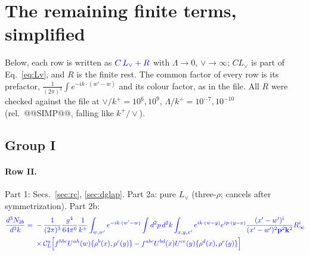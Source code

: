 \documentclass[10pt]{article}
\numberwithin{equation}{section}
\newcommand{\new}[1]{{\color{blue}#1}}
\newcommand{\Lv}{L_{\vee}}
\newcommand{\CL}{\mathcal C_L}
\newcommand{\pre}{\frac{1}{(2\pi)^3}}
\newcommand{\phw}{e^{-ik\cdot(w'-w)}}
\begin{document}
\section{The remaining finite terms, simplified}\label{sec:simp}
Below, each row is written as $\new{C\,\Lv+R}$ with $\Lambda\to0$, $\vee\to\infty$; $C\Lv$ is part of Eq.~\eqref{eq:Lv}, and $R$ is the finite rest. The common factor of every row is its prefactor, $\pre\int\phw$ and its colour factor, as in the file. All $R$ were checked against the file at $\vee/k^+=10^6,10^9$, $\Lambda/k^+=10^{-7},10^{-10}$ (rel.\ @@SIMP@@, falling like $k^+/\vee$).

\subsection{Group I}
\paragraph{Row II.} Part 1: Secs.~\ref{sec:rc}, \ref{sec:dglap}. Part 2a: pure $\Lv$ (three-$\rho$; cancels after symmetrization). Part 2b:
\begin{equation*}
\new{\begin{aligned}\frac{d^3N_{2b}}{d^3k}={}&-\pre\frac{g^4}{64\pi^6}\frac{1}{k^+}\int_{w,w'}\phw\int d^2p\,d^2k\int_{x,y,x'}e^{ik\cdot(w-y)}e^{ip\cdot(y-x)}\frac{(x'-w')^i}{(x'-w')^2\mathbf p^2\mathbf k^2}R^i_\infty\\&\times\CL^a\Big[f^{hbc}U^{ah}(w)\{\rho^b(x),\rho^c(y)\}-f^{abc}U^{bd}(x)U^{ce}(y)\{\rho^d(x),\rho^e(y)\}\Big]\end{aligned}}
\end{equation*}
\end{document}
